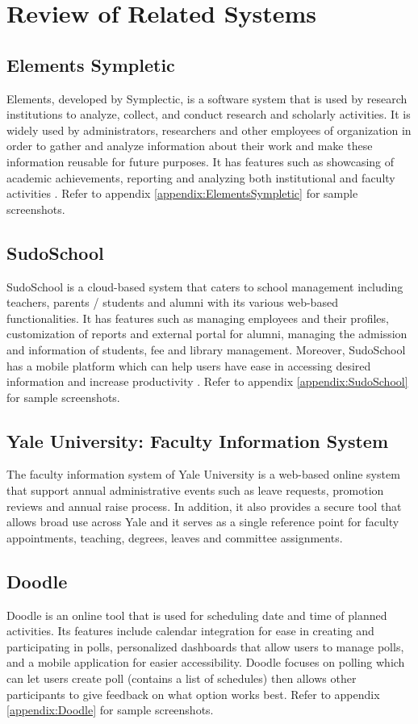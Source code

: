 \section{Review of Related Systems}

\subsection{Elements Sympletic}
Elements, developed by Symplectic, is a software system that is used by research institutions to analyze, collect, and conduct research and scholarly activities. It is widely used by administrators, researchers and other employees of organization in order to gather and analyze information about their work and make these information reusable for future purposes. It has features such as showcasing of academic achievements, reporting and analyzing both institutional and faculty activities \cite{ref:Elements}. Refer to appendix \ref{appendix:ElementsSympletic} for sample screenshots.

\subsection{SudoSchool}
SudoSchool is a cloud-based system that caters to school management including teachers, parents / students and alumni with its various web-based functionalities. It has features such as managing employees and their profiles, customization of reports and external portal for alumni, managing the admission and information of students, fee and library management. Moreover, SudoSchool has a mobile platform which can help users have ease in accessing desired information and increase productivity \cite{ref:SudoSchool}. Refer to appendix \ref{appendix:SudoSchool} for sample screenshots.

\subsection{Yale University: Faculty Information System}
The faculty information system of Yale University is a web-based online system that support annual administrative events such as leave requests, promotion reviews and annual raise process. In addition, it also provides a secure tool that allows broad use across Yale and it serves as a single reference point for faculty appointments, teaching, degrees, leaves and committee assignments. 

\subsection{Doodle}
Doodle is an online tool that is used for scheduling date and time of planned activities. Its features include calendar integration for ease in creating and participating in polls, personalized dashboards that allow users to manage polls, and a mobile application for easier accessibility. Doodle focuses on polling which can let users create poll (contains a list of schedules) then allows other participants to give feedback on what option works best. Refer to appendix \ref{appendix:Doodle} for sample screenshots.

